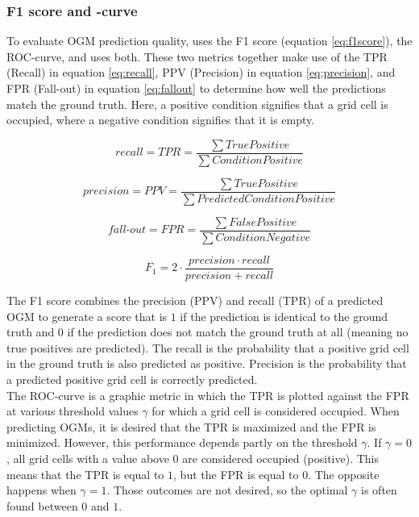 \subsubsection{F1 score and -curve}
To evaluate \gls{OGM} prediction quality, \cite{dequaire2018deep} uses the F1 score (equation \ref{eq:f1score}), \cite{hoermann2018dynamic} the \gls{ROC}-curve, and \cite{schreiber2019long} uses both. These two metrics together make use of the \gls{TPR} (Recall) in equation \ref{eq:recall}, \gls{PPV} (Precision) in equation \ref{eq:precision}, and \gls{FPR} (Fall-out) in equation \ref{eq:fallout} to determine how well the predictions match the ground truth. Here, a positive condition signifies that a grid cell is occupied, where a negative condition signifies that it is empty.

\begin{equation} \label{eq:recall}
	recall = TPR = \frac{\sum True Positive}{\sum Condition Positive}
\end{equation}

\begin{equation} \label{eq:precision}
	precision = PPV = \frac{\sum True Positive}{\sum Predicted Condition Positive}
\end{equation}

\begin{equation} \label{eq:fallout}
	fall\text{-}out = FPR = \frac{\sum False Positive}{\sum Condition Negative}
\end{equation}

\begin{equation} \label{eq:f1score}
	F_1 = 2 \cdot \frac{precision \cdot recall}{precision + recall}
\end{equation}

The F1 score combines the precision (\gls{PPV}) and recall (\gls{TPR}) of a predicted \gls{OGM} to generate a score that is $1$ if the prediction is identical to the ground truth and $0$ if the prediction does not match the ground truth at all (meaning no true positives are predicted). The recall is the probability that a positive grid cell in the ground truth is also predicted as positive. Precision is the probability that a predicted positive grid cell is correctly predicted. \\

The \gls{ROC}-curve is a graphic metric in which the \gls{TPR} is plotted against the \gls{FPR} at various threshold values $\gamma$ for which a grid cell is considered occupied. When predicting \glspl{OGM}, it is desired that the \gls{TPR} is maximized and the \gls{FPR} is minimized. However, this performance depends partly on the threshold $\gamma$. If $\gamma = 0$, all grid cells with a value above $0$ are considered occupied (positive). This means that the \gls{TPR} is equal to $1$, but the \gls{FPR} is equal to $0$. The opposite happens when $\gamma = 1$. Those outcomes are not desired, so the optimal $\gamma$ is often found between $0$ and $1$.  \\

